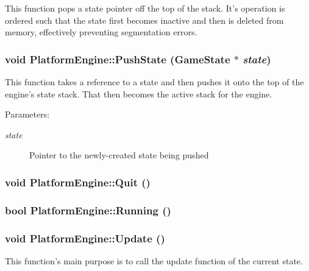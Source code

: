 This function pops a state pointer off the top of the stack. It's operation is ordered such that the state first becomes inactive and then is deleted from memory, effectively preventing segmentation errors. \hypertarget{class_platform_engine_98e3d34b6ee831bcc1d26bac83bfe8d8}{
\subsubsection[{PushState}]{\setlength{\rightskip}{0pt plus 5cm}void PlatformEngine::PushState ({\bf GameState} $\ast$ {\em state})}}
\label{db/da1/class_platform_engine_98e3d34b6ee831bcc1d26bac83bfe8d8}


This function takes a reference to a state and then pushes it onto the top of the engine's state stack. That then becomes the active stack for the engine.

\begin{Desc}
\item[Parameters:]
\begin{description}
\item[{\em state}]Pointer to the newly-created state being pushed \end{description}
\end{Desc}
\hypertarget{class_platform_engine_dbcdd91813cabbe51bb2f86eb23e772a}{
\subsubsection[{Quit}]{\setlength{\rightskip}{0pt plus 5cm}void PlatformEngine::Quit ()}}
\label{db/da1/class_platform_engine_dbcdd91813cabbe51bb2f86eb23e772a}


\hypertarget{class_platform_engine_31ec37c0222f4694cc3c0e819e143038}{
\subsubsection[{Running}]{\setlength{\rightskip}{0pt plus 5cm}bool PlatformEngine::Running ()}}
\label{db/da1/class_platform_engine_31ec37c0222f4694cc3c0e819e143038}


\hypertarget{class_platform_engine_d3ab75304226ad3fcac6b66ce3cedbc7}{
\subsubsection[{Update}]{\setlength{\rightskip}{0pt plus 5cm}void PlatformEngine::Update ()}}
\label{db/da1/class_platform_engine_d3ab75304226ad3fcac6b66ce3cedbc7}


This function's main purpose is to call the update function of the current state. 